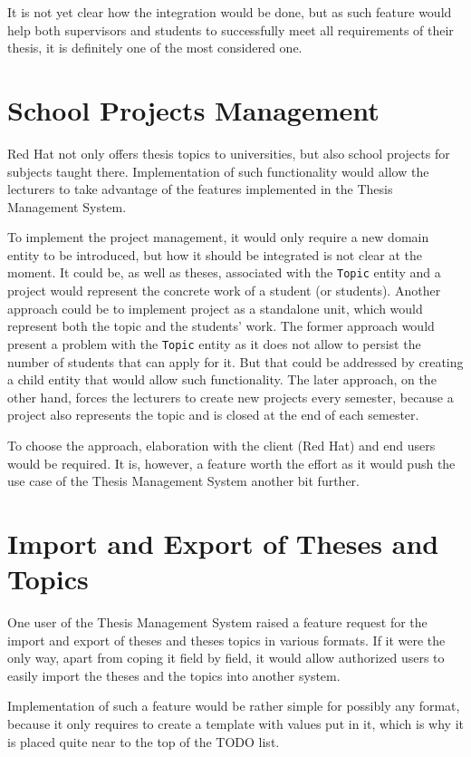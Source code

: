 It is not yet clear how the integration would be done, but as such feature would help both supervisors and students to successfully meet all requirements of their thesis, it is definitely one of the most considered one.

\section{School Projects Management}

Red Hat not only offers thesis topics to universities, but also school projects for subjects taught there. Implementation of such functionality would allow the lecturers to take advantage of the features implemented in the Thesis Management System.

To implement the project management, it would only require a new domain entity to be introduced, but how it should be integrated is not clear at the moment. It could be, as well as theses, associated with the \texttt{Topic} entity and a project would represent the concrete work of a student (or students). Another approach could be to implement project as a standalone unit, which would represent both the topic and the students' work. The former approach would present a problem with the \texttt{Topic} entity as it does not allow to persist the number of students that can apply for it. But that could be addressed by creating a child entity that would allow such functionality. The later approach, on the other hand, forces the lecturers to create new projects every semester, because a project also represents the topic and is closed at the end of each semester.

To choose the approach, elaboration with the client (Red Hat) and end users would be required. It is, however, a feature worth the effort as it would push the use case of the Thesis Management System another bit further.

\section{Import and Export of Theses and Topics}

One user of the Thesis Management System raised a feature request for the import and export of theses and theses topics in various formats. If it were the only way, apart from coping it field by field, it would allow authorized users to easily import the theses and the topics into another system.

Implementation of such a feature would be rather simple for possibly any format, because it only requires to create a template with values put in it, which is why it is placed quite near to the top of the TODO list.